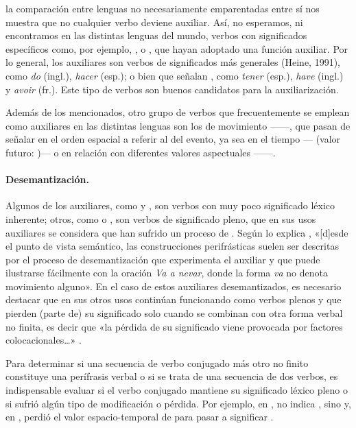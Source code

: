 \begin{cita}
[\ldots] la comparación entre lenguas no necesariamente emparentadas entre sí
nos muestra que no cualquier verbo deviene auxiliar. Así, no esperamos, ni
encontramos en las distintas lenguas del mundo, verbos con significados
específicos como, por ejemplo, ,  o , que
hayan adoptado una función auxiliar. Por lo general, los auxiliares son verbos
de significados más generales (Heine, 1991), como \textit{do} (ingl.),
\textit{hacer} (esp.); o bien que señalan , como \textit{tener}
(esp.), \textit{have} (ingl.) y \textit{avoir} (fr.). Este tipo de verbos son
buenos candidatos para la auxiliarización.
\end{cita}

Además de los mencionados, otro grupo de verbos que frecuentemente se emplean
como auxiliares en las distintas lenguas son los de movimiento ------, que pasan de señalar  en el
orden espacial a referir al  del evento, ya sea en el tiempo
\parencite{cuenca1999} --- (valor futuro: )---
o en relación con diferentes valores aspectuales ------.

\paragraph{Desemantización.} Algunos de los auxiliares, como  y
, son verbos con muy poco significado léxico inherente; otros, como
 o , son verbos de significado pleno, que en sus
usos auxiliares se considera que han sufrido un proceso de
. Según lo explica \textcite[21]{garciafernandez2006},
«[d]esde el punto de vista semántico, las construcciones perifrásticas suelen ser
descritas por el proceso de desemantización que experimenta el auxiliar y que
puede ilustrarse fácilmente con la oración \textit{Va a nevar}, donde la forma
\textit{va} no denota movimiento alguno». En el caso de estos auxiliares
desemantizados, es necesario destacar que en sus otros usos continúan
funcionando como verbos plenos y que pierden (parte de) su significado solo
cuando se combinan con otra forma verbal no finita, es decir que «la pérdida de
su significado viene provocada por factores colocacionales\ldots»
\parencite[124]{tsutahara2022}.

Para determinar si una secuencia de verbo conjugado más otro no finito constituye
una perífrasis verbal o si se trata de una secuencia de dos verbos, es
indispensable evaluar si el verbo conjugado mantiene su significado léxico pleno
o si sufrió algún tipo de modificación o pérdida. Por ejemplo, en
,  no indica , sino
 y, en ,  perdió el valor
espacio-temporal de  para pasar a significar
.

